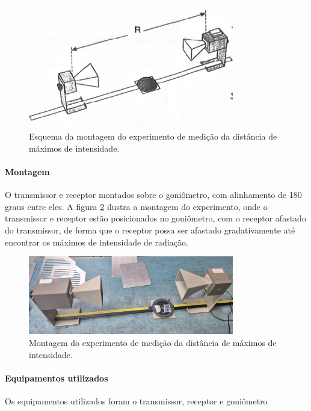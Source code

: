 \documentclass[12pt]{article}
\begin{document}
\begin{figure}[H]
  \centering
  \includegraphics[width=0.8\textwidth]{img/metodo1esquema.png}
  \caption{Esquema da montagem do experimento de medição da distância
  de máximos de intensidade.}
  \label{fig:img/metodo1esquema.png}
\end{figure}

\paragraph{Montagem}
O transmissor e receptor montados sobre o goniômetro,  com
alinhamento de 180 graus entre eles. A figura \ref{fig:img/metodo1montagem.png}
ilustra a montagem do experimento, onde o transmissor e receptor
estão posicionados no goniômetro, com o receptor afastado do
transmissor, de forma que o receptor possa ser afastado
gradativamente até encontrar os máximos de intensidade de radiação.

\begin{figure}[H]
  \centering
  \includegraphics[width=0.8\textwidth]{img/metodo1montagem.png}
  \caption{Montagem do experimento de medição da distância de máximos
  de intensidade.}
  \label{fig:img/metodo1montagem.png}
\end{figure}

\paragraph{Equipamentos utilizados}
Os equipamentos utilizados foram o transmissor, receptor e goniômetro
\end{document}
